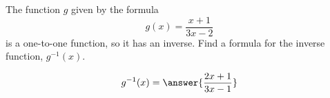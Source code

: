 \documentclass{ximera}
\author{Bobby Ramsey}
\begin{document}
\begin{exercise}




The function $g$ given by the formula
\[ g(x) = \frac{x+1}{3x-2} \]
is a one-to-one function, so it has an inverse.  Find a formula for the inverse function, $g^{-1}(x)$.

\[ g^{-1}(x) = \answer{\frac{2x+1}{3x-1}}\]


\end{exercise}
\end{document}
